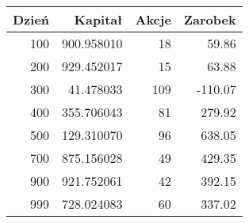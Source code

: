 \begin{tabular}{rrrr}
\toprule
 Dzień &    Kapitał &  Akcje &  Zarobek \\
\midrule
   100 & 900.958010 &     18 &    59.86 \\
   200 & 929.452017 &     15 &    63.88 \\
   300 &  41.478033 &    109 &  -110.07 \\
   400 & 355.706043 &     81 &   279.92 \\
   500 & 129.310070 &     96 &   638.05 \\
   700 & 875.156028 &     49 &   429.35 \\
   900 & 921.752061 &     42 &   392.15 \\
   999 & 728.024083 &     60 &   337.02 \\
\bottomrule
\end{tabular}
